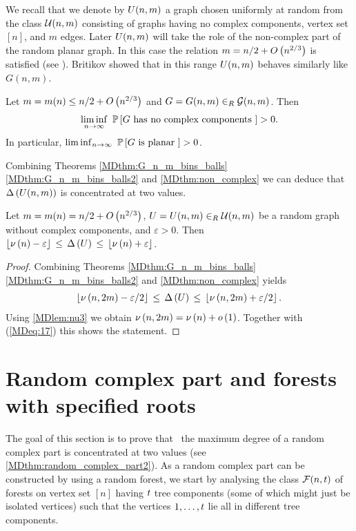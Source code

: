 We recall that we denote by $U(n,m)$ a graph chosen uniformly at random from the class $\mathcal{U}(n,m)$ consisting of graphs having no complex components, vertex set $[n]$, and $m$ edges. Later $U(n,m)$ will take the role of the non-complex part of the random planar graph. In this case the relation $m=n/2+O\left(n^{2/3}\right)$ is satisfied (see ). Britikov \cite{Britikov1989} showed that in this range $U(n,m)$ behaves similarly like $G(n,m)$. 

\begin{thm}\label{MDthm:non_complex}
	Let $m=m(n)\leq n/2+O\left(n^{2/3}\right)$ and $G=G(n,m)\in_R \mathcal G(n,m)$. Then 
	\begin{align*}
	\liminf_{n \to \infty}~ \mathbb{P}\left[G \text{ has no complex components }\right]>0.
	\end{align*}
In particular, $\liminf_{n \to \infty}~ \mathbb{P}\left[G \text{ is planar }\right]>0$.
\end{thm}

Combining Theorems \ref{MDthm:G_n_m_bins_balls}\ref{MDthm:G_n_m_bins_balls2} and \ref{MDthm:non_complex} we can deduce that \whp\ $\Delta\left(U(n,m)\right)$ is concentrated at two values.

\begin{lem}\label{MDlem:random_non_complex}
	Let $m=m(n)= n/2+O\left(n^{2/3}\right)$, $U=U(n,m)\in_R \mathcal{U}(n,m)$ be a random graph without complex components, and $\varepsilon>0$. Then \whp\ $\left\lfloor\nu\left(n\right)-\varepsilon\right\rfloor\hspace{0.06cm}\leq\hspace{0.06cm} \Delta\left(U\right)\hspace{0.06cm}\leq\hspace{0.06cm} \left\lfloor\nu\left(n\right)+\varepsilon\right\rfloor$.
\end{lem}
\begin{proof}
Combining Theorems \ref{MDthm:G_n_m_bins_balls}\ref{MDthm:G_n_m_bins_balls2} and \ref{MDthm:non_complex} yields \whp
\begin{align}\label{MDeq:17}
	\left\lfloor\nu\left(n, 2m\right)-\varepsilon/2\right\rfloor\hspace{0.06cm}\leq\hspace{0.06cm} \Delta\left(U\right)\hspace{0.06cm}\leq\hspace{0.06cm} \left\lfloor\nu\left(n, 2m\right)+\varepsilon/2\right\rfloor.
\end{align}
Using \ref{MDlem:nu3} we obtain $\nu\left(n, 2m\right)=\nu\left(n\right)+o\left(1\right)$. Together with (\ref{MDeq:17}) this shows the statement. 
\end{proof}

\section{Random complex part and forests with specified roots}\label{MDsec:forests}
The goal of this section is to prove that \whp\ the maximum degree of a random complex part is concentrated at two values (see \ref{MDthm:random_complex_part2}). As a random complex part can be constructed by using a random forest, we start by analysing the class $\mathcal{F}(n,t)$ of forests on vertex set $[n]$ having $t$ tree components (some of which might just be isolated vertices) such that the vertices $1, \ldots, t$ lie all in different tree components. 

